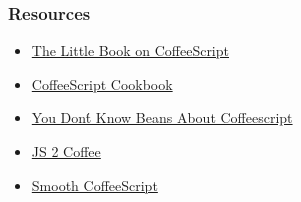 \documentclass{beamer}
\begin{document}
\begin{frame}
  \frametitle{Resources}
  \begin{itemize}
    \item \href{http://arcturo.github.io/library/coffeescript/}{The
        Little Book on CoffeeScript}
    \item \href{http://www.coffeescriptcookbook.com}{CoffeeScript Cookbook}
    \item \href{http://aseemk.com/talks/intro-to-coffeescript}{You
        Don\'t Know Beans About Coffeescript}
    \item \href{http://js2coffee.org/}{JS 2 Coffee}
    \item
      \href{http://autotelicum.github.io/Smooth-CoffeeScript/}{Smooth CoffeeScript}
  \end{itemize}
\end{frame}
\end{document}
